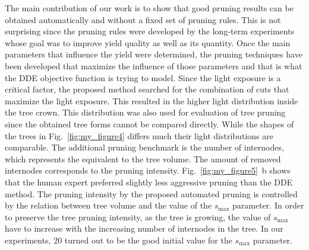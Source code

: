 The main contribution of our work is to show that good pruning results
can be obtained automatically and without a fixed set of pruning rules.
This is not surprising since the pruning rules were developed by the
long-term experiments whose goal was to improve yield quality as well as
its quantity. Once the main parameters that influence the yield were
determined, the pruning techniques have been developed that maximize the
influence of those parameters and that is what the DDE objective
function is trying to model. Since the light exposure is a critical
factor, the proposed method searched for the combination of cuts that
maximize the light exposure. This resulted in the higher light
distribution inside the tree crown. This distribution was also used for
evaluation of tree pruning since the obtained tree forms cannot be
compared directly. While the shapes of the trees in Fig.~\ref{fig:my_figure4} differs much
their light distributions are comparable. The additional pruning
benchmark is the number of internodes, which represents the equivalent
to the tree volume. The amount of removed internodes corresponds to the
pruning intensity. Fig.~\ref{fig:my_figure5}~b shows that the human expert preferred
slightly less aggressive pruning than the DDE method. The pruning
intensity by the proposed automated pruning is controlled by the
relation between tree volume and the value of the \(s_{\mathrm{\max}}\)
parameter. In order to preserve the tree pruning intensity, as the tree
is growing, the value of \(s_{\mathrm{\max}}\) have to increase with the
increasing number of internodes in the tree. In our experiments, 20
turned out to be the good initial value for the \(s_{\mathrm{\max}}\)
parameter.
